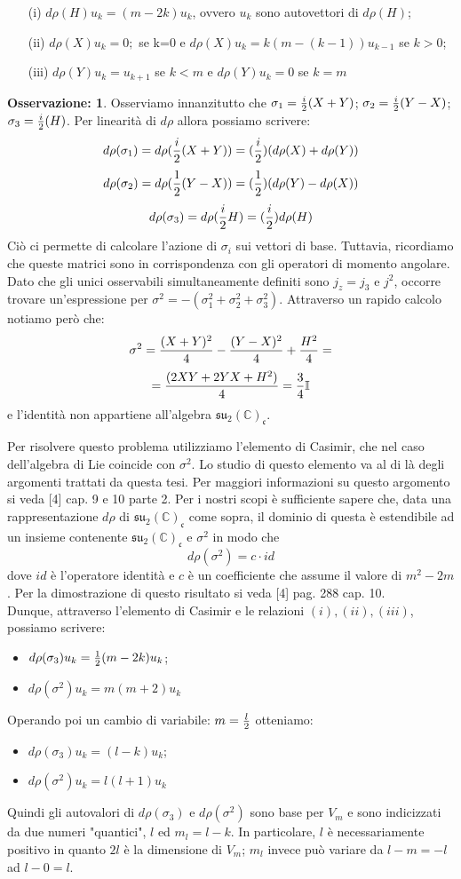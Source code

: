 \documentclass[12pt,a4paper]{report}
\theoremstyle{definition}
\theoremstyle{Theorem}
\theoremstyle{definition}
\theoremstyle{definition}
\theoremstyle{definition}
\newtheorem{Obs}[Def]{Osservazione:}
\begin{document}
\begin{itemize}
	\item[(i)] $d\rho(H)u_k=(m-2k)u_k$, ovvero $u_k$ sono autovettori di $d\rho(H)$;
	\item[(ii)] $d\rho(X)u_k=0;$ se k=0 e $d\rho(X)u_k=k(m-(k-1))u_{k-1}$ se $k>0$;
	\item[(iii)] $d\rho(Y)u_k=u_{k+1}$ se $k<m$ e $d\rho(Y)u_k=0$ se $k=m$
\end{itemize}
\begin{Obs}
	Osserviamo innanzitutto che $\sigma_1={i\over 2}(X+Y)$; $\sigma_2={i\over 2}(Y-X)$; $\sigma_3={i\over 2}(H)$. Per linearità di $d\rho$ allora possiamo scrivere: $$d\rho(\sigma_1)=d\rho({i\over 2}(X+Y))=({i\over2})(d\rho(X)+d\rho(Y))$$
	$$d\rho(\sigma_2)=d\rho({1\over 2}(Y-X))=({1\over2})(d\rho(Y)-d\rho(X))$$
	$$d\rho(\sigma_3)=d\rho({i\over 2}H)=({i\over2})d\rho(H)$$
	Ciò ci permette di calcolare l'azione di $\sigma_i$ sui vettori di base. Tuttavia, ricordiamo che queste matrici sono in corrispondenza con gli operatori di momento angolare. Dato che gli unici osservabili simultaneamente definiti sono $j_z=j_3$ e $j^2$, occorre trovare un'espressione per $\sigma^2=-(\sigma_1^2+\sigma_2^2+\sigma_3^2)$. Attraverso un rapido calcolo notiamo però che:
	$$\sigma^2={(X+Y)^2\over 4}-{(Y-X)^2\over 4}+{H^2\over 4}=$$
	$$={(2XY+2YX+H^2)\over 4}={3\over 4}\mathbb{I}$$
	e l'identità non appartiene all'algebra $\mathfrak{su_2(\mathbb{C})_c}$.
\end{Obs}
Per risolvere questo problema utilizziamo l'elemento di Casimir, che nel caso dell'algebra di Lie coincide con $\sigma^2$. Lo studio di questo elemento va al di là degli argomenti trattati da questa tesi. Per maggiori informazioni su questo argomento si veda [4] cap. 9 e 10 parte 2. Per i nostri scopi è sufficiente sapere che, data una rappresentazione $d\rho$ di $\mathfrak{su_2(\mathbb{C})_c}$ come sopra, il dominio di questa è estendibile ad un insieme contenente $\mathfrak{su_2(\mathbb{C})_c}$ e $\sigma^2$ in modo che
$$d\rho(\sigma^2)=c\cdot id$$ 
dove $id$ è l'operatore identità e $c$ è un coefficiente che assume il valore di $m^2-2m$. Per la dimostrazione di questo risultato si veda [4] pag. 288 cap. 10.\\
Dunque, attraverso l'elemento di Casimir e le relazioni $(i),(ii),(iii)$, possiamo scrivere:
	\begin{itemize}
		\centering
		\item $d\rho(\sigma_3)u_k={1\over 2}(m-2k)u_k$;
		\item $d\rho(\sigma^2)u_k=m(m+2)u_k$
	\end{itemize}
Operando poi un cambio di variabile: $m={l\over2}$ otteniamo:
\begin{itemize}
	\centering
	\item $d\rho(\sigma_3)u_k=(l-k)u_k$;
	\item $d\rho(\sigma^2)u_k=l(l+1)u_k$
\end{itemize}
Quindi gli autovalori di $d\rho(\sigma_3)$ e $d\rho(\sigma^2)$ sono base per $V_m$ e sono indicizzati da due numeri "quantici", $l$ ed $m_l=l-k$. In particolare, $l$ è necessariamente positivo in quanto $2l$ è la dimensione di $V_m$; $m_l$ invece può variare da $l-m=-l$ ad $l-0=l$.
\end{document}

